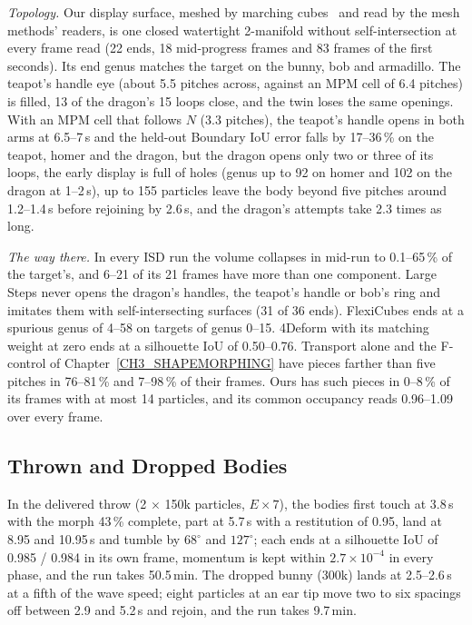 \textit{Topology.} Our display surface, meshed by marching cubes~\citep{lorensen1998marching} and read by the mesh methods' readers, is one closed watertight
2-manifold without self-intersection at every frame read (22 ends, 18 mid-progress frames and 83 frames of the first seconds).
Its end genus matches the target on the bunny, bob and armadillo. The teapot's handle eye (about 5.5 pitches across, against an
MPM cell of 6.4 pitches) is filled, 13 of the dragon's 15 loops close, and the twin loses the same openings. With an MPM cell
that follows $N$ (3.3 pitches), the teapot's handle opens in both arms at 6.5--7\,s and the held-out Boundary IoU error falls by
17--36\,\% on the teapot, homer and the dragon, but the dragon opens only two or three of its loops, the early display is full of
holes (genus up to 92 on homer and 102 on the dragon at 1--2\,s), up to 155 particles leave the body beyond five pitches around
1.2--1.4\,s before rejoining by 2.6\,s, and the dragon's attempts take 2.3 times as long.

\textit{The way there.} In every ISD run the volume collapses in mid-run to 0.1--65\,\% of the target's, and 6--21 of its 21
frames have more than one component. Large Steps never opens the dragon's handles, the teapot's handle or bob's ring and imitates
them with self-intersecting surfaces (31 of 36 ends). FlexiCubes ends at a spurious genus of 4--58 on targets of genus 0--15.
4Deform with its matching weight at zero ends at a silhouette IoU of 0.50--0.76. Transport alone and the F-control of
Chapter~\ref{CH3_SHAPEMORPHING} have pieces farther than five pitches in 76--81\,\% and 7--98\,\% of their frames. Ours has such
pieces in 0--8\,\% of its frames with at most 14 particles, and its common occupancy reads 0.96--1.09 over every frame.

\subsection{Thrown and Dropped Bodies}
In the delivered throw (2 $\times$ 150k particles, $E\times7$), the bodies first touch at 3.8\,s with the morph 43\,\% complete,
part at 5.7\,s with a restitution of 0.95, land at 8.95 and 10.95\,s and tumble by $68^\circ$ and $127^\circ$; each ends at a
silhouette IoU of 0.985 / 0.984 in its own frame, momentum is kept within $2.7\times10^{-4}$ in every phase, and the run takes
50.5\,min. The dropped bunny (300k) lands at 2.5--2.6\,s at a fifth of the wave speed; eight particles at an ear tip move two to
six spacings off between 2.9 and 5.2\,s and rejoin, and the run takes 9.7\,min.

